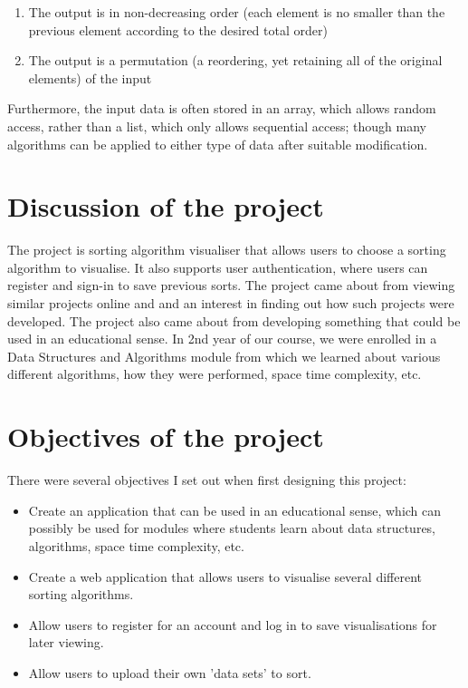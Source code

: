 \begin{enumerate}
    \item The output is in non-decreasing order (each element is no smaller than 
    the previous element according to the desired total order)
    \item The output is a permutation (a reordering, yet retaining all of the 
    original elements) of the input
\end{enumerate}

Furthermore, the input data is often stored in an array, which allows random 
access, rather than a list, which only allows sequential access; though many 
algorithms can be applied to either type of data after suitable modification.

\section{Discussion of the project}
The project is sorting algorithm visualiser that allows users to choose a sorting
algorithm to visualise. It also supports user authentication, where users can 
register and sign-in to save previous sorts. The project came about from viewing 
similar projects online and and an interest in finding out how such projects were
developed. The project also came about from developing something that could be 
used in an educational sense. In 2nd year of our course, we were enrolled in a 
Data Structures and Algorithms module from which we learned about various 
different algorithms, how they were performed, space time complexity, etc.

\newpage
\section{Objectives of the project}
There were several objectives I set out when first designing this project:

\begin{itemize}
    \item Create an application that can be used in an educational sense, which 
    can possibly be used for modules where students learn about data structures, 
    algorithms, space time complexity, etc.
    \item Create a web application that allows users to visualise several 
    different sorting algorithms.
    \item Allow users to register for an account and log in to save
    visualisations for later viewing.
    \item Allow users to upload their own 'data sets' to sort.
\end{itemize}

